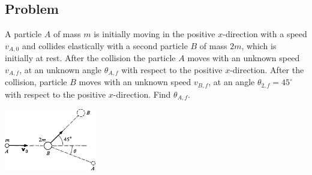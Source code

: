 \documentclass[solutions]{esg8012pset}
\begin{document}
\subsection{Problem}
  A particle $A$ of mass $m$ is initially moving in the positive $x$-direction with a speed $v_{A,0}$ and collides elastically with a second particle $B$ of mass $2m$, which is initially at rest.  After the collision the particle $A$ moves with an unknown speed $v_{A,f}$, at an unknown angle $\theta_{A, f}$ with respect to the positive $x$-direction. After the collision, particle $B$ moves with an unknown speed $v_{B, f}$, at an angle $\theta_{2,f} = 45^{\circ}$ with respect to the positive $x$-direction.  Find $\theta_{A, f}$.
  \begin{center}\includegraphics[width=0.3\textwidth]{ps07_3}\end{center}
\end{document}
